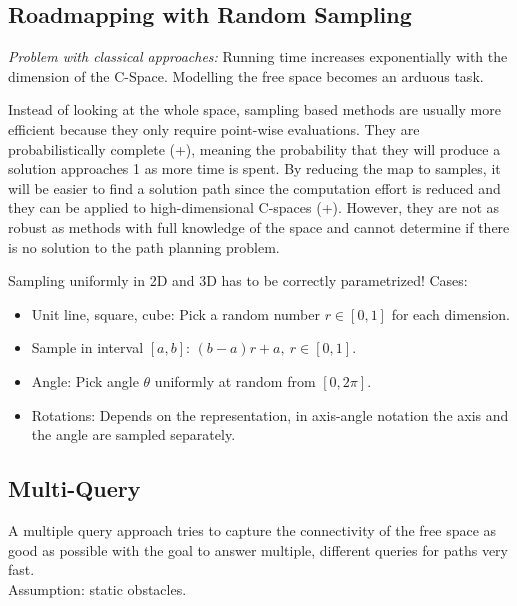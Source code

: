 \begin{multicols*}{2}
\section{Roadmapping with Random Sampling}
\textit{Problem with classical approaches:} Running time increases exponentially with the dimension of the C-Space. Modelling the free space becomes an arduous task.\par
Instead of looking at the whole space, sampling based methods are usually more efficient because they only require point-wise evaluations.
They are probabilistically complete (+), meaning the probability that they will produce a solution approaches 1 as more time is spent.
By reducing the map to samples, it will be easier to find a solution path since the computation effort is reduced and they can be applied to high-dimensional C-spaces (+).
However, they are not as robust as methods with full knowledge of the space and cannot determine if there is no solution to the path planning problem.\par

Sampling uniformly in 2D and 3D has to be correctly parametrized! Cases:
\begin{itemize}
	\item Unit line, square, cube: Pick a random number $r \in [0, 1]$
	for each dimension.
	\item Sample in interval $[a,b]$: $(b-a)r + a, \ r \in [0, 1]$.
	\item Angle: Pick angle $\theta$ uniformly at random from $[0, 2\pi]$.
	\item Rotations: Depends on the representation, in axis-angle notation the axis and the angle are sampled separately.
\end{itemize}


\subsection{Multi-Query}
A multiple query approach tries to capture the connectivity of the free space as good as possible with the goal to answer multiple, different queries for paths very fast.\\
Assumption: static obstacles.


\end{multicols*}
